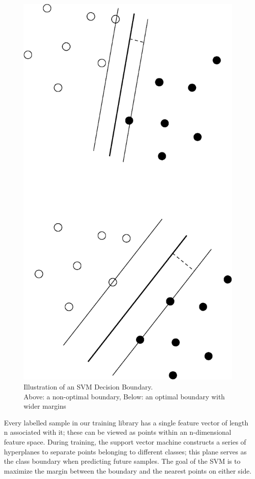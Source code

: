 \documentclass[12pt]{article}
\begin{document}
\begin{figure}
  \centering
  \includegraphics[scale=1]{classifier}
  \caption[Illustration of an SVM Decision Boundary]
   {Illustration of an SVM Decision Boundary. \\ Above: a non-optimal boundary, Below: an optimal boundary with wider margins}
  \label{fig:Classifier}
\end{figure}

Every labelled sample in our training library has a single feature vector of length n associated with it; these can be viewed as points within an n-dimensional feature space. During training, the support vector machine constructs a series of hyperplanes to separate points belonging to different classes; this plane serves as the class boundary when predicting future samples. The goal of the SVM is to maximize the margin between the boundary and the nearest points on either side. 
\end{document}
